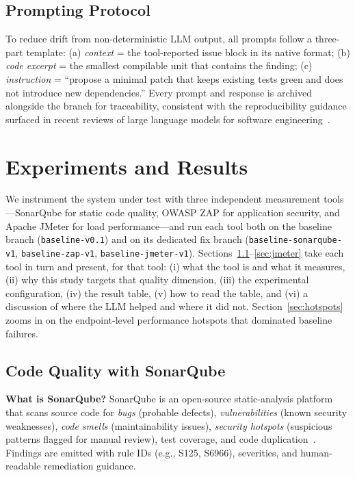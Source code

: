 \documentclass[conference,letterpaper]{IEEEtran}
\begin{document}
\subsection{Prompting Protocol}\label{sec:prompting}
To reduce drift from non-deterministic LLM output, all prompts follow a three-part template: (a) \emph{context} = the tool-reported issue block in its native format; (b) \emph{code excerpt} = the smallest compilable unit that contains the finding; (c) \emph{instruction} = ``propose a minimal patch that keeps existing tests green and does not introduce new dependencies.'' Every prompt and response is archived alongside the branch for traceability, consistent with the reproducibility guidance surfaced in recent reviews of large language models for software engineering~\cite{ref14}.

\section{Experiments and Results}
We instrument the system under test with three independent measurement tools---SonarQube for static code quality, OWASP ZAP for application security, and Apache JMeter for load performance---and run each tool both on the baseline branch (\texttt{baseline-v0.1}) and on its dedicated fix branch (\texttt{baseline-sonarqube-v1}, \texttt{baseline-zap-v1}, \texttt{baseline-jmeter-v1}). Sections~\ref{sec:sonar}--\ref{sec:jmeter} take each tool in turn and present, for that tool: (i) what the tool is and what it measures, (ii) why this study targets that quality dimension, (iii) the experimental configuration, (iv) the result table, (v) how to read the table, and (vi) a discussion of where the LLM helped and where it did not. Section~\ref{sec:hotspots} zooms in on the endpoint-level performance hotspots that dominated baseline failures.

\subsection{Code Quality with SonarQube}\label{sec:sonar}
\textbf{What is SonarQube?} SonarQube is an open-source static-analysis platform that scans source code for \emph{bugs} (probable defects), \emph{vulnerabilities} (known security weaknesses), \emph{code smells} (maintainability issues), \emph{security hotspots} (suspicious patterns flagged for manual review), test coverage, and code duplication~\cite{ref16}. Findings are emitted with rule IDs (e.g., \textsc{S125}, \textsc{S6966}), severities, and human-readable remediation guidance.
\end{document}
